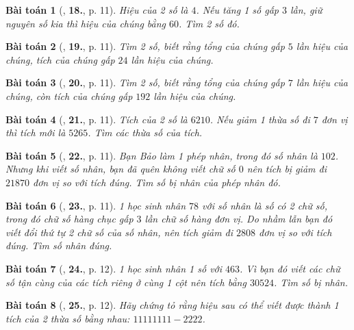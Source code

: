\documentclass[oneside]{book}
\numberwithin{equation}{section}
\newtheorem{baitoan}{Bài toán}[section]
\begin{document}
\begin{baitoan}[\cite{Binh_Toan_6_tap_1}, \textbf{18.}, p. 11]
	Hiệu của 2 số là $4$. Nếu tăng 1 số gấp $3$ lần, giữ nguyên số kia thì hiệu của chúng bằng $60$. Tìm 2 số đó.
\end{baitoan}

\begin{baitoan}[\cite{Binh_Toan_6_tap_1}, \textbf{19.}, p. 11]
	Tìm 2 số, biết rằng tổng của chúng gấp $5$ lần hiệu của chúng, tích của chúng gấp $24$ lần hiệu của chúng.
\end{baitoan}

\begin{baitoan}[\cite{Binh_Toan_6_tap_1}, \textbf{20.}, p. 11]
	Tìm 2 số, biết rằng tổng của chúng gấp $7$ lần hiệu của chúng, còn tích của chúng gấp $192$ lần hiệu của chúng.
\end{baitoan}

\begin{baitoan}[\cite{Binh_Toan_6_tap_1}, \textbf{21.}, p. 11]
	Tích của 2 số là $6210$. Nếu giảm 1 thừa số đi $7$ đơn vị thì tích mới là $5265$. Tìm các thừa số của tích.
\end{baitoan}

\begin{baitoan}[\cite{Binh_Toan_6_tap_1}, \textbf{22.}, p. 11]
	Bạn Bảo làm 1 phép nhân, trong đó số nhân là $102$. Nhưng khi viết số nhân, bạn đã quên không viết chữ số $0$ nên tích bị giảm đi $21870$ đơn vị so với tích đúng. Tìm số bị nhân của phép nhân đó.
\end{baitoan}

\begin{baitoan}[\cite{Binh_Toan_6_tap_1}, \textbf{23.}, p. 11]
	1 học sinh nhân $78$ với số nhân là số có 2 chữ số, trong đó chữ số hàng chục gấp $3$ lần chữ số hàng đơn vị. Do nhầm lẫn bạn đó viết đổi thứ tự 2 chữ số của số nhân, nên tích giảm đi $2808$ đơn vị so với tích đúng. Tìm số nhân đúng.
\end{baitoan}

\begin{baitoan}[\cite{Binh_Toan_6_tap_1}, \textbf{24.}, p. 12]
	1 học sinh nhân 1 số với $463$. Vì bạn đó viết các chữ số tận cùng của các tích riêng ở cùng 1 cột nên tích bằng $30524$. Tìm số bị nhân.
\end{baitoan}

\begin{baitoan}[\cite{Binh_Toan_6_tap_1}, \textbf{25.}, p. 12]
	Hãy chứng tỏ rằng hiệu sau có thể viết được thành 1 tích của 2 thừa số bằng nhau: $11111111 - 2222$.
\end{baitoan}
\end{document}
